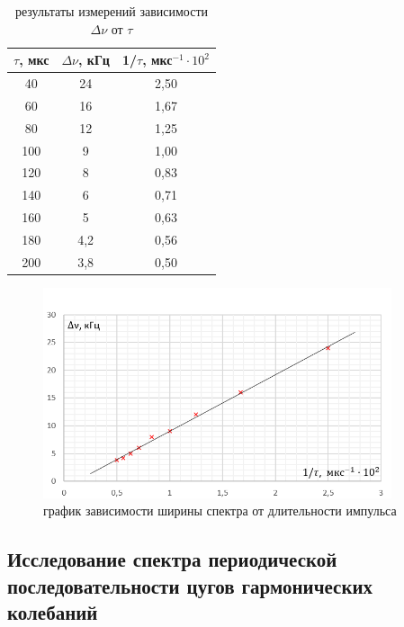 \documentclass[a4paper]{article}
\theoremstyle{definition}
\theoremstyle{remark}
\begin{document}
\begin{table}[h!]
    \centering
    \begin{tabular}{|c|c|c|}
    \hline
    $\tau$, мкс & $\Delta\nu$, кГц & 1/$\tau$, мкс$^{-1} \cdot 10^2$ \\ \hline
    40          & 24                & 2,50                            \\ \hline
    60          & 16                & 1,67                            \\ \hline
    80          & 12                & 1,25                            \\ \hline
    100         & 9                 & 1,00                            \\ \hline
    120         & 8                 & 0,83                            \\ \hline
    140         & 6                 & 0,71                            \\ \hline
    160         & 5                 & 0,63                            \\ \hline
    180         & 4,2               & 0,56                            \\ \hline
    200         & 3,8               & 0,50                            \\ \hline
    \end{tabular}
    \caption{результаты измерений зависимости $\Delta\nu$ от $\tau$}
    \end{table}

    \begin{figure}[h!]
        \centering
        \includegraphics[width = 290pt]{image/graph1.png}
        \caption{график зависимости ширины спектра от длительности импульса}
    \end{figure}


\newpage

\subsection{Исследование спектра периодической последовательности цугов гармонических колебаний}
\end{document}
